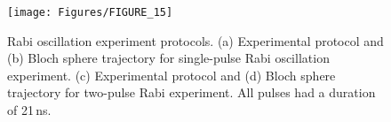\documentclass[journal]{IEEEtran}
\newcommand{\CR}[1]{{\color{black}#1}}
\begin{document}

\begin{figure}[bt!]
\texttt{[image: Figures/FIGURE\_15]}
\caption{\CR{Rabi oscillation experiment protocols. (a) Experimental protocol and (b) Bloch sphere trajectory for single-pulse Rabi oscillation experiment. (c) Experimental protocol and (d) Bloch sphere trajectory for two-pulse Rabi experiment. All pulses had a duration of 21\,ns.}}\label{rabisingle}
\end{figure}
\end{document}
